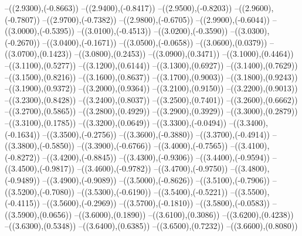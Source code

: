 {	--({\sx*(2.9300)},{\sy*(-0.8663)})
	--({\sx*(2.9400)},{\sy*(-0.8417)})
	--({\sx*(2.9500)},{\sy*(-0.8203)})
	--({\sx*(2.9600)},{\sy*(-0.7807)})
	--({\sx*(2.9700)},{\sy*(-0.7382)})
	--({\sx*(2.9800)},{\sy*(-0.6705)})
	--({\sx*(2.9900)},{\sy*(-0.6044)})
	--({\sx*(3.0000)},{\sy*(-0.5395)})
	--({\sx*(3.0100)},{\sy*(-0.4513)})
	--({\sx*(3.0200)},{\sy*(-0.3590)})
	--({\sx*(3.0300)},{\sy*(-0.2670)})
	--({\sx*(3.0400)},{\sy*(-0.1671)})
	--({\sx*(3.0500)},{\sy*(-0.0658)})
	--({\sx*(3.0600)},{\sy*(0.0379)})
	--({\sx*(3.0700)},{\sy*(0.1423)})
	--({\sx*(3.0800)},{\sy*(0.2453)})
	--({\sx*(3.0900)},{\sy*(0.3471)})
	--({\sx*(3.1000)},{\sy*(0.4464)})
	--({\sx*(3.1100)},{\sy*(0.5277)})
	--({\sx*(3.1200)},{\sy*(0.6144)})
	--({\sx*(3.1300)},{\sy*(0.6927)})
	--({\sx*(3.1400)},{\sy*(0.7629)})
	--({\sx*(3.1500)},{\sy*(0.8216)})
	--({\sx*(3.1600)},{\sy*(0.8637)})
	--({\sx*(3.1700)},{\sy*(0.9003)})
	--({\sx*(3.1800)},{\sy*(0.9243)})
	--({\sx*(3.1900)},{\sy*(0.9372)})
	--({\sx*(3.2000)},{\sy*(0.9364)})
	--({\sx*(3.2100)},{\sy*(0.9150)})
	--({\sx*(3.2200)},{\sy*(0.9013)})
	--({\sx*(3.2300)},{\sy*(0.8428)})
	--({\sx*(3.2400)},{\sy*(0.8037)})
	--({\sx*(3.2500)},{\sy*(0.7401)})
	--({\sx*(3.2600)},{\sy*(0.6662)})
	--({\sx*(3.2700)},{\sy*(0.5865)})
	--({\sx*(3.2800)},{\sy*(0.4929)})
	--({\sx*(3.2900)},{\sy*(0.3929)})
	--({\sx*(3.3000)},{\sy*(0.2879)})
	--({\sx*(3.3100)},{\sy*(0.1785)})
	--({\sx*(3.3200)},{\sy*(0.0649)})
	--({\sx*(3.3300)},{\sy*(-0.0494)})
	--({\sx*(3.3400)},{\sy*(-0.1634)})
	--({\sx*(3.3500)},{\sy*(-0.2756)})
	--({\sx*(3.3600)},{\sy*(-0.3880)})
	--({\sx*(3.3700)},{\sy*(-0.4914)})
	--({\sx*(3.3800)},{\sy*(-0.5850)})
	--({\sx*(3.3900)},{\sy*(-0.6766)})
	--({\sx*(3.4000)},{\sy*(-0.7565)})
	--({\sx*(3.4100)},{\sy*(-0.8272)})
	--({\sx*(3.4200)},{\sy*(-0.8845)})
	--({\sx*(3.4300)},{\sy*(-0.9306)})
	--({\sx*(3.4400)},{\sy*(-0.9594)})
	--({\sx*(3.4500)},{\sy*(-0.9817)})
	--({\sx*(3.4600)},{\sy*(-0.9782)})
	--({\sx*(3.4700)},{\sy*(-0.9750)})
	--({\sx*(3.4800)},{\sy*(-0.9489)})
	--({\sx*(3.4900)},{\sy*(-0.9089)})
	--({\sx*(3.5000)},{\sy*(-0.8626)})
	--({\sx*(3.5100)},{\sy*(-0.7906)})
	--({\sx*(3.5200)},{\sy*(-0.7080)})
	--({\sx*(3.5300)},{\sy*(-0.6190)})
	--({\sx*(3.5400)},{\sy*(-0.5221)})
	--({\sx*(3.5500)},{\sy*(-0.4115)})
	--({\sx*(3.5600)},{\sy*(-0.2969)})
	--({\sx*(3.5700)},{\sy*(-0.1810)})
	--({\sx*(3.5800)},{\sy*(-0.0583)})
	--({\sx*(3.5900)},{\sy*(0.0656)})
	--({\sx*(3.6000)},{\sy*(0.1890)})
	--({\sx*(3.6100)},{\sy*(0.3086)})
	--({\sx*(3.6200)},{\sy*(0.4238)})
	--({\sx*(3.6300)},{\sy*(0.5348)})
	--({\sx*(3.6400)},{\sy*(0.6385)})
	--({\sx*(3.6500)},{\sy*(0.7232)})
	--({\sx*(3.6600)},{\sy*(0.8080)})
}
